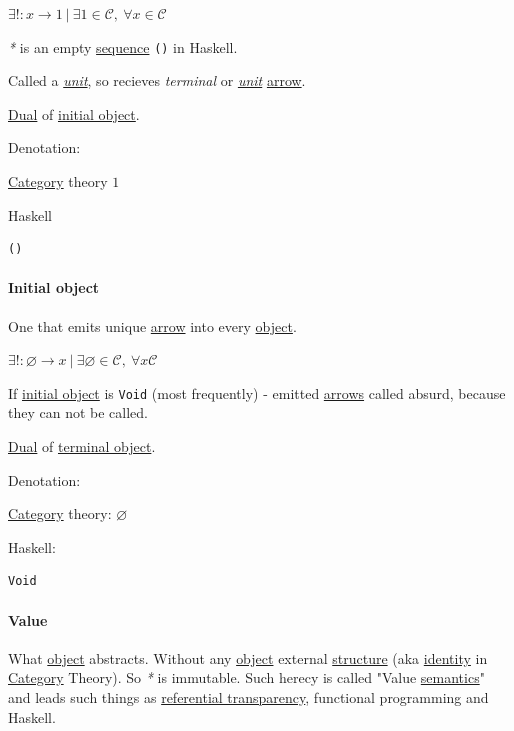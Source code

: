 \documentclass[a4paper,14pt,oneside]{book}
\begin{document}
\(\exists ! : x \to 1 \ | \ \exists 1 \in \mathcal{C}, \ \forall x \in \mathcal{C}\)

\emph{*} is an empty \hyperref[orge2b57aa]{sequence} \texttt{()} in Haskell.

Called a \emph{\hyperref[org37e9e01]{unit}}, so recieves \emph{terminal} or \emph{\hyperref[org37e9e01]{unit}} \hyperref[org0b51b24]{arrow}.

\hyperref[orgef9bcb8]{Dual} of \hyperref[org49bdc74]{initial object}.

Denotation:

\hyperref[org82baa03]{Category} theory
\(1\)

Haskell
\begin{verbatim}
()
\end{verbatim}

\paragraph{\label{org49bdc74}Initial object}
\label{sec:orgd7a5fd7}
One that emits unique \hyperref[org0b51b24]{arrow} into every \hyperref[org8d6cd26]{object}.

\(\exists ! : \varnothing \to x \ | \ \exists \varnothing \in \mathcal{C}, \ \forall x \mathcal{C}\)

If \hyperref[org49bdc74]{initial object} is \texttt{Void} (most frequently) - emitted \hyperref[org8dc36eb]{arrows} called absurd, because they can not be called.

\hyperref[orgef9bcb8]{Dual} of \hyperref[orgbc0b3c7]{terminal object}.

Denotation:

\hyperref[org82baa03]{Category} theory:
\(\varnothing\)

Haskell:
\begin{verbatim}
Void
\end{verbatim}

\paragraph{Value}
\label{sec:orga3075b1}
What \hyperref[org8d6cd26]{object} abstracts. Without any \hyperref[org8d6cd26]{object} external \hyperref[org105c77d]{structure} (aka \hyperref[org5f89edb]{identity} in \hyperref[org82baa03]{Category} Theory). So \emph{*} is immutable. Such herecy is called "Value \hyperref[org929d85d]{semantics}" and leads such things as \hyperref[org3e9af89]{referential transparency}, functional programming and Haskell.
\end{document}
